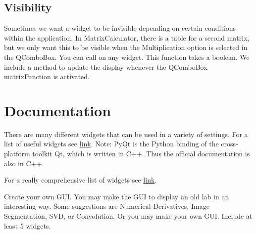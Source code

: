 \subsection*{Visibility}
Sometimes we want a widget to be invisible depending on certain conditions within the application.  In MatrixCalculator, there is a table for a second matrix, but we only want this to be visible when the Multiplication option is selected in the QComboBox.  You can call  on any widget.  This function takes a boolean.  We include a method to update the display whenever the QComboBox matrixFunction is activated.

\section*{Documentation}
There are many different widgets that can be used in a variety of settings.  For a list of useful widgets see \href{http://doc.qt.io/qt-4.8/widgets-and-layouts.html}{link}.
Note: PyQt is the Python binding of the cross-platform toolkit Qt, which is written in C++.  Thus the official documentation is also in C++.  

For a really comprehensive list of widgets see \href{http://pyqt.sourceforge.net/Docs/PyQt4/qtgui.html}{link}.


\begin{problem}
Create your own GUI.  You may make the GUI to display an old lab in an interesting way.  Some suggestions are Numerical Derivatives, Image Segmentation, SVD, or Convolution.  Or you may make your own GUI.  Include at least 5 widgets.
\end{problem}

